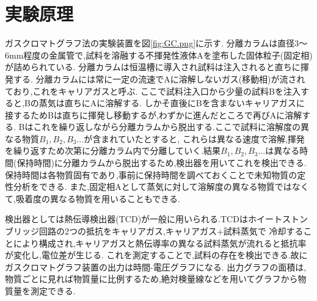 \section{実験原理}
ガスクロマトグラフ法の実験装置を図\ref{fig:GC.png}に示す.
分離カラムは直径3〜6mm程度の金属管で,試料を溶融する不揮発性液体Aを塗布した固体粒子(固定相)が詰められている.
分離カラムは恒温槽に導入され試料は注入されると直ちに揮発する.
分離カラムには常に一定の流速でAに溶解しないガス(移動相)が流されており,これをキャリアガスと呼ぶ.
ここで試料注入口から少量の試料Bを注入すると,Bの蒸気は直ちにAに溶解する.
しかそ直後にBを含まないキャリアガスに接するためBは直ちに揮発し移動するが,わずかに進んだところで再びAに溶解する.
Bはこれを繰り返しながら分離カラムから脱出する.ここで試料に溶解度の異なる物質$B_1,B_2,B_3...$が含まれていたとすると,
これらは異なる速度で溶解,揮発を繰り返すため次第に分離カラム内で分離していく.結果$B_1,B_2,B_3...$は異なる時間(保持時間)に分離カラムから脱出するため,検出器を用いてこれを検出できる.
保持時間は各物質固有であり,事前に保持時間を調べておくことで未知物質の定性分析をできる.
また,固定相Aとして蒸気に対して溶解度の異なる物質ではなくて,吸着度の異なる物質を用いることもできる.

検出器としては熱伝導検出器(TCD)が一般に用いられる.TCDはホイートストンブリッジ回路の2つの抵抗をキャリアガス,キャリアガス+試料蒸気で
冷却することにより構成され,キャリアガスと熱伝導率の異なる試料蒸気が流れると抵抗率が変化し,電位差が生じる.
これを測定することで,試料の存在を検出できる.故にガスクロマトグラフ装置の出力は時間-電圧グラフになる.
出力グラフの面積は,物質ごとに見れば物質量に比例するため,絶対検量線などを用いてグラフから物質量を測定できる.